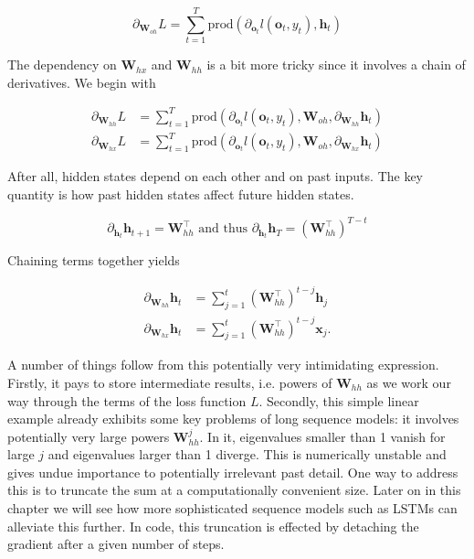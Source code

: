 $$\partial_{\mathbf{W}_{oh}} L = \sum_{t=1}^T \mathrm{prod}
\left(\partial_{\mathbf{o}_t} l(\mathbf{o}_t, y_t), \mathbf{h}_t\right)$$

The dependency on $\mathbf{W}_{hx}$ and $\mathbf{W}_{hh}$ is a bit more tricky since it involves a chain of derivatives. We begin with

$$
\begin{aligned}
\partial_{\mathbf{W}_{hh}} L & = \sum_{t=1}^T \mathrm{prod}
\left(\partial_{\mathbf{o}_t} l(\mathbf{o}_t, y_t), \mathbf{W}_{oh}, \partial_{\mathbf{W}_{hh}} \mathbf{h}_t\right) \\
\partial_{\mathbf{W}_{hx}} L & = \sum_{t=1}^T \mathrm{prod}
\left(\partial_{\mathbf{o}_t} l(\mathbf{o}_t, y_t), \mathbf{W}_{oh}, \partial_{\mathbf{W}_{hx}} \mathbf{h}_t\right)
\end{aligned}
$$

After all, hidden states depend on each other and on past inputs. The key quantity is how past hidden states affect future hidden states.

$$\partial_{\mathbf{h}_t} \mathbf{h}_{t+1} = \mathbf{W}_{hh}^\top \text{ and thus } \partial_{\mathbf{h}_t} \mathbf{h}_T = \left(\mathbf{W}_{hh}^\top\right)^{T-t}$$

Chaining terms together yields

$$
\begin{aligned}
\partial_{\mathbf{W}_{hh}} \mathbf{h}_t & = \sum_{j=1}^t \left(\mathbf{W}_{hh}^\top\right)^{t-j} \mathbf{h}_j \\
\partial_{\mathbf{W}_{hx}} \mathbf{h}_t & = \sum_{j=1}^t \left(\mathbf{W}_{hh}^\top\right)^{t-j} \mathbf{x}_j.
\end{aligned}
$$

A number of things follow from this potentially very intimidating expression. Firstly, it pays to store intermediate results, i.e. powers of $\mathbf{W}_{hh}$ as we work our way through the terms of the loss function $L$. Secondly, this simple linear example already exhibits some key problems of long sequence models: it involves potentially very large powers $\mathbf{W}_{hh}^j$. In it, eigenvalues smaller than 1 vanish for large $j$ and eigenvalues larger than 1 diverge. This is numerically unstable and gives undue importance to potentially irrelevant past detail. One way to address this is to truncate the sum at a computationally convenient size. Later on in this chapter we will see how more sophisticated sequence models such as LSTMs can alleviate this further. In code, this truncation is effected by detaching the gradient after a given number of steps.

